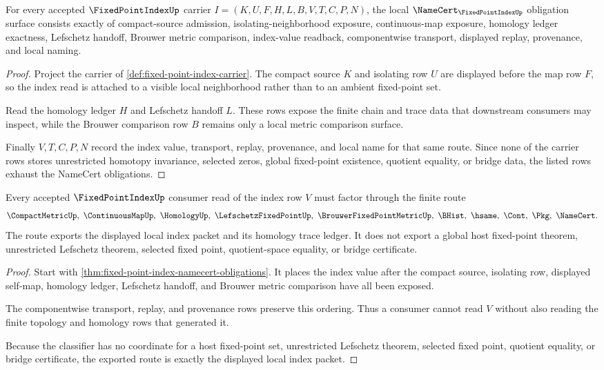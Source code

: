 \begin{theorem}
\label{thm:fixed-point-index-namecert-obligations}
For every accepted $\FixedPointIndexUp$ carrier $I=(K,U,F,H,L,B,V,T,C,P,N)$, the local $\NameCert_{\FixedPointIndexUp}$ obligation surface consists exactly of compact-source admission, isolating-neighborhood exposure, continuous-map exposure, homology ledger exactness, Lefschetz handoff, Brouwer metric comparison, index-value readback, componentwise transport, displayed replay, provenance, and local naming.
\end{theorem}
\begin{proof}
Project the carrier of \autoref{def:fixed-point-index-carrier}. The compact source $K$ and isolating row $U$ are displayed before the map row $F$, so the index read is attached to a visible local neighborhood rather than to an ambient fixed-point set.

Read the homology ledger $H$ and Lefschetz handoff $L$. These rows expose the finite chain and trace data that downstream consumers may inspect, while the Brouwer comparison row $B$ remains only a local metric comparison surface.

Finally $V,T,C,P,N$ record the index value, transport, replay, provenance, and local name for that same route. Since none of the carrier rows stores unrestricted homotopy invariance, selected zeros, global fixed-point existence, quotient equality, or bridge data, the listed rows exhaust the NameCert obligations.
\end{proof}

\begin{theorem}
\label{thm:fixed-point-index-dependency-route}
Every accepted $\FixedPointIndexUp$ consumer read of the index row $V$ must factor through the finite route
$$
\CompactMetricUp,\ \ContinuousMapUp,\ \HomologyUp,\ \LefschetzFixedPointUp,\ \BrouwerFixedPointMetricUp,\ \BHist,\ \hsame,\ \Cont,\ \Pkg,\ \NameCert .
$$
The route exports the displayed local index packet and its homology trace ledger. It does not export a global host fixed-point theorem, unrestricted Lefschetz theorem, selected fixed point, quotient-space equality, or bridge certificate.
\end{theorem}
\begin{proof}
Start with \autoref{thm:fixed-point-index-namecert-obligations}. It places the index value after the compact source, isolating row, displayed self-map, homology ledger, Lefschetz handoff, and Brouwer metric comparison have all been exposed.

The componentwise transport, replay, and provenance rows preserve this ordering. Thus a consumer cannot read $V$ without also reading the finite topology and homology rows that generated it.

Because the classifier has no coordinate for a host fixed-point set, unrestricted Lefschetz theorem, selected fixed point, quotient equality, or bridge certificate, the exported route is exactly the displayed local index packet.
\end{proof}

